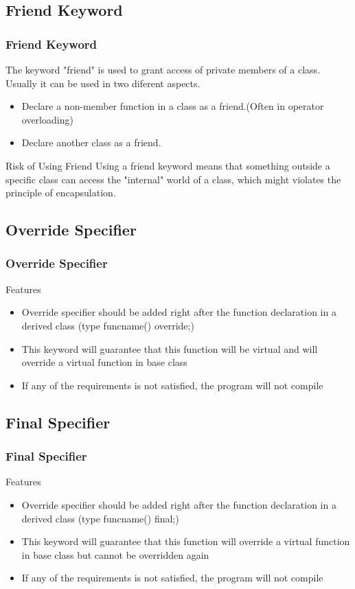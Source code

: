 \documentclass{beamer}
\begin{document}
\begin{frame}
	\section{Friend Keyword}
	\frametitle{Friend Keyword}
	The keyword "friend" is used to grant access of private members of a class. Usually it can be used in two diferent aspects.
	\begin{itemize}
		\item Declare a non-member function in a class as a friend.(Often in operator overloading)
		\item Declare another class as a friend.
	\end{itemize}
	\begin{block}{Risk of Using Friend}
		Using a friend keyword means that something outside a specific class can access the "internal" world of a class, which might violates the principle of {\color{blue} encapsulation}.
	\end{block}
	
\end{frame}

\begin{frame}
	\section{Override Specifier}
	\frametitle{Override Specifier}
	Features
	\begin{itemize}
		\item Override specifier should be added right after the function declaration in a derived class ({\color{blue}type funcname() override;})
		\item This keyword will guarantee that this function will be virtual and will override a virtual function in base class
		\item If any of the requirements is not satisfied, the program will not compile
	\end{itemize}
\end{frame}

\begin{frame}
	\section{Final Specifier}
	\frametitle{Final Specifier}
	Features
	\begin{itemize}
		\item Override specifier should be added right after the function declaration in a derived class ({\color{blue}type funcname() final;})
		\item This keyword will guarantee that this function will override a virtual function in base class {\color{blue} but cannot be overridden again}
		\item If any of the requirements is not satisfied, the program will not compile
	\end{itemize}
\end{frame}
\end{document}
